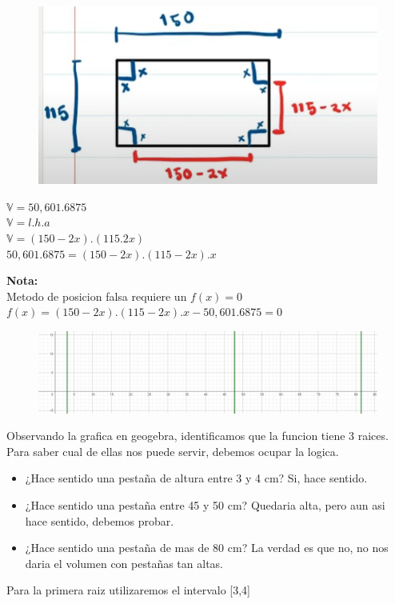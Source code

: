 \documentclass{article}
\theoremstyle{mytheoremstyle}
\theoremstyle{mytheoremstyle}
\theoremstyle{myproblemstyle}
\begin{document}
\begin{figure}[ht]
    \includegraphics*[scale=1]{img/secante1.png}
\end{figure}

\noindent $\mathbb{V} = 50,601.6875$
\\$\mathbb{V} = l.h.a$
\\$\mathbb{V} = (150-2x).(115.2x)$
\\$50,601.6875 = (150-2x).(115-2x).x$

\noindent \textbf{Nota: }\\Metodo de posicion falsa requiere un $f(x)=0$
\\ $f(x)=(150-2x).(115-2x).x-50,601.6875=0$

\begin{figure}[ht]
    \includegraphics*[scale=0.5]{img/secante2.png}
\end{figure}
Observando la grafica en geogebra, identificamos que la funcion tiene 3 raices. Para saber cual de ellas nos puede servir, debemos ocupar la logica.
\begin{itemize}
    \item ¿Hace sentido una pestaña de altura entre 3 y 4 cm? Si, hace sentido.
    \item ¿Hace sentido una pestaña entre 45 y 50 cm? Quedaria alta, pero aun asi hace sentido, debemos probar.
    \item ¿Hace sentido una pestaña de mas de 80 cm? La verdad es que no, no nos daria el volumen con pestañas tan altas.
\end{itemize}

Para la primera raiz utilizaremos el intervalo [3,4]
\end{document}
